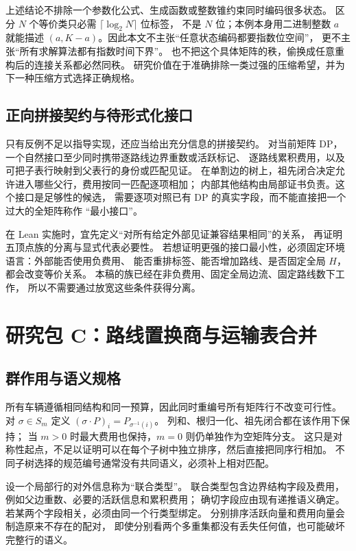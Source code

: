 \documentclass[UTF8,a4paper,11pt,fontset=fandol]{ctexart}
\theoremstyle{definition}
\begin{document}
上述结论不排除一个参数化公式、生成函数或整数锥约束同时编码很多状态。
区分 $N$ 个等价类只必需 $\lceil\log_2 N\rceil$ 位标签，
不是 $N$ 位；本例本身用二进制整数 $a$ 就能描述
$(a,K-a)$。因此本文不主张“任意状态编码都要指数位空间”，
更不主张“所有求解算法都有指数时间下界”。
也不把这个具体矩阵的秩，偷换成任意重构后的连接关系都必然同秩。
研究价值在于准确排除一类过强的压缩希望，并为下一种压缩方式选择正确规格。

\subsection{正向拼接契约与待形式化接口}

只有反例不足以指导实现，还应当给出充分信息的拼接契约。
对当前矩阵 DP，一个自然接口至少同时携带逐路线边界重数或活跃标记、
逐路线累积费用，以及可把子表行映射到父表行的身份或匹配见证。
在单割边的树上，祖先闭合决定允许进入哪些父行，费用按同一匹配逐项相加；
内部其他结构由局部证书负责。这个接口是足够性的候选，
需要逐项对照已有 DP 的真实字段，而不能直接把一个过大的全矩阵称作
“最小接口”。

在 Lean 实施时，宜先定义“对所有给定外部见证兼容结果相同”的关系，
再证明五顶点族的分离与显式代表必要性。
若想证明更强的接口最小性，必须固定环境语言：外部能否使用负费用、
能否重排标签、能否增加路线、是否固定全局 $H$，都会改变等价关系。
本稿的族已经在非负费用、固定全局边流、固定路线数下工作，
所以不需要通过放宽这些条件获得分离。

\section{研究包 C：路线置换商与运输表合并}\label{sec:orbit}

\subsection{群作用与语义规格}

所有车辆遵循相同结构和同一预算，因此同时重编号所有矩阵行不改变可行性。
对 $\sigma\in S_m$ 定义
$(\sigma\cdot P)_i=P_{\sigma^{-1}(i)}$。
列和、根归一化、祖先闭合都在该作用下保持；
当 $m>0$ 时最大费用也保持，$m=0$ 则仍单独作为空矩阵分支。
这只是对称性起点，不足以证明可以在每个子树中独立排序，然后直接把同序行相加。
不同子树选择的规范编号通常没有共同语义，必须补上相对匹配。

设一个局部行的对外信息称为“联合类型”。
联合类型包含边界结构字段及费用，例如父边重数、必要的活跃信息和累积费用；
确切字段应由现有递推语义确定。
若某两个字段相关，必须由同一个行类型绑定。
分别排序活跃向量和费用向量会制造原来不存在的配对，
即使分别看两个多重集都没有丢失任何值，也可能破坏完整行的语义。
\end{document}
